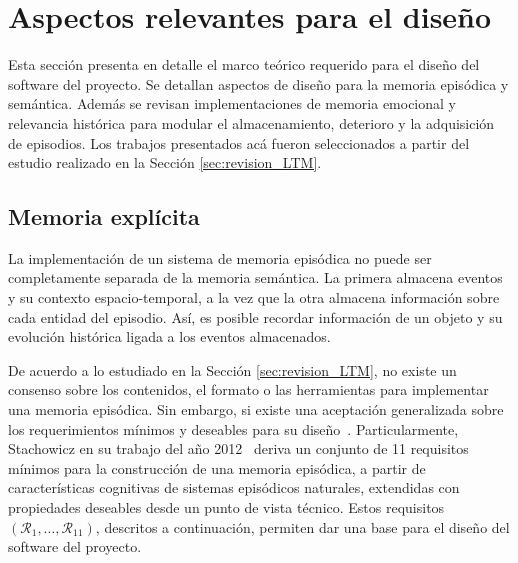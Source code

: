 \section{Aspectos relevantes para el diseño}

Esta sección presenta en detalle el marco teórico requerido para el diseño del software del proyecto. Se detallan aspectos de diseño para la memoria episódica y semántica. Además se revisan implementaciones de memoria emocional y relevancia histórica para modular el almacenamiento, deterioro y la adquisición de episodios. Los trabajos presentados acá fueron seleccionados a partir del estudio realizado en la Sección \ref{sec:revision_LTM}.

\subsection{Memoria explícita}\label{sec:ltm_exp}

La implementación de un sistema de memoria episódica no puede ser completamente separada de la memoria semántica. La primera almacena eventos y su contexto espacio-temporal, a la vez que la otra almacena información sobre cada entidad del episodio. Así, es posible recordar información de un objeto y su evolución histórica ligada a los eventos almacenados.

De acuerdo a lo estudiado en la Sección \ref{sec:revision_LTM}, no existe un consenso sobre los contenidos, el formato o las herramientas para implementar una memoria episódica. Sin embargo, si existe una aceptación generalizada sobre los requerimientos mínimos y deseables para su diseño~\cite{Vijayakumar2014,Ho2009,Jockel2008}. Particularmente, Stachowicz en su trabajo del año 2012~\cite{Stachowicz2012} deriva un conjunto de 11 requisitos mínimos para la construcción de una memoria episódica, a partir de características cognitivas de sistemas episódicos naturales, extendidas con propiedades deseables desde un punto de vista técnico. Estos requisitos $(\mathcal{R}_{1},\ldots,\mathcal{R}_{11})$, descritos a continuación, permiten dar una base para el diseño del software del proyecto.


